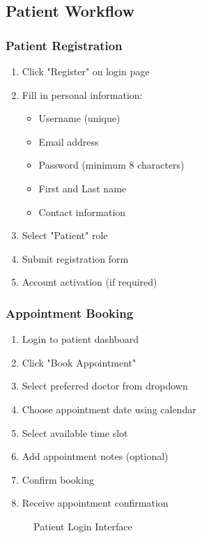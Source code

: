 \documentclass[12pt,a4paper]{article}
\begin{document}
\subsection{Patient Workflow}

\subsubsection{Patient Registration}

\begin{enumerate}
    \item Click "Register" on login page
    \item Fill in personal information:
    \begin{itemize}
        \item Username (unique)
        \item Email address
        \item Password (minimum 8 characters)
        \item First and Last name
        \item Contact information
    \end{itemize}
    \item Select "Patient" role
    \item Submit registration form
    \item Account activation (if required)
\end{enumerate}

\subsubsection{Appointment Booking}

\begin{enumerate}
    \item Login to patient dashboard
    \item Click "Book Appointment"
    \item Select preferred doctor from dropdown
    \item Choose appointment date using calendar
    \item Select available time slot
    \item Add appointment notes (optional)
    \item Confirm booking
    \item Receive appointment confirmation
\end{enumerate}

\begin{figure}[H]
\centering
{}
\caption{Patient Login Interface}
\end{figure}
\end{document}
